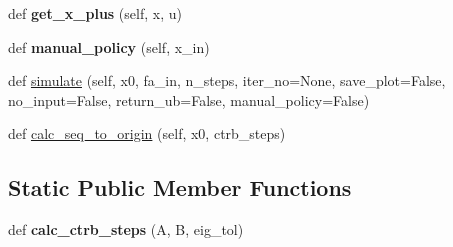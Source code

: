 \begin{DoxyCompactItemize}
def {\bfseries get\+\_\+x\+\_\+plus} (self, x, u)
\item 
\mbox{\label{classgddp_1_1system_1_1_system_af30555621fbcb55027f492611b8baebf}} 
def {\bfseries manual\+\_\+policy} (self, x\+\_\+in)
\item 
def \mbox{\hyperlink{classgddp_1_1system_1_1_system_ab09b391c54b83eff64c7724fc6d5d554}{simulate}} (self, x0, fa\+\_\+in, n\+\_\+steps, iter\+\_\+no=None, save\+\_\+plot=False, no\+\_\+input=False, return\+\_\+ub=False, manual\+\_\+policy=False)
\item 
def \mbox{\hyperlink{classgddp_1_1system_1_1_system_a3fe9138f9a1e2e749a125763c2eb9a24}{calc\+\_\+seq\+\_\+to\+\_\+origin}} (self, x0, ctrb\+\_\+steps)
\end{DoxyCompactItemize}
\subsection*{Static Public Member Functions}
\begin{DoxyCompactItemize}
\item 
\mbox{\label{classgddp_1_1system_1_1_system_aa4e0670c216f4af9d20465a73a582774}} 
def {\bfseries calc\+\_\+ctrb\+\_\+steps} (A, B, eig\+\_\+tol)
\end{DoxyCompactItemize}
